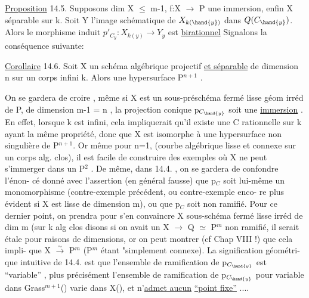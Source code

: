 
\uline{Proposition} 14.5. Supposons dim X $\leqslant$ m-1, 
 f:X $\to$ P une immersion,  enfin X séparable sur k. Soit Y l'image
schématique de $X_{k(\hand{y})}$ dans $Q(C_{\hand{y}})$. Alors le morphisme induit
$p'_{C_y} : X_{k(y)} \to Y_y$ est \uline{birationnel}
Signalons la conséquence suivante:

\uline{Corollaire} 14.6. Soit X un schéma algébrique projectif  
\uline{et séparable}
de dimension n sur un corps infini k. Alors  
  une hypersurface  P$^{n+1}$ .

On se gardera de croire , même si X est un sous-préschéma fermé
lisse géom irréd de P, de dimension m-1 = n ,  la projection conique p$_{C_{\hand{y}}}$
soit  une \uline{immersion} . En effet, lorsque k est infini, cela impliquerait
qu'il existe une C rationnelle sur k ayant la même propriété, donc que X
est isomorphe à une hypersurface non singulière de  P$^{n+1}$. Or
même pour n=1, (courbe algébrique  lisse  et connexe sur un corps alg.
clos), il est facile de construire des exemples où X ne peut s'immerger
dans un P$^2$ . De même, dans 14.4. , on se gardera de confondre l'énon-%
cé donné avec l'assertion (en général fausse) que p$_C$ soit lui-même un
monomorphisme (contre-exemple précédent, ou contre-exemple enco-%
re plus évident si X est lisse de dimension m), ou que p$_C$ soit non
ramifié. Pour ce dernier point, on prendra pour s'en convaincre X
sous-schéma fermé lisse  irréd de dim m (sur k alg clos disons
si  on avait un X $\to$ Q $\simeq$ P$^m$ non ramifié, il serait étale pour
raisons de dimensions, or on peut montrer (cf Chap VIII !) que cela impli-%
que X $\xrightarrow{\sim}$ P$^m$ (P$^m$ étant "simplement connexe). \hand{--} La signification géométri-%
que intuitive de 14.4. est que l'ensemble de
ramification de p$_{C_{\hand{y}}}$ est ``variable'' , plus précisément l'ensemble de
ramification de p$_{C_{\hand{y}}}$ pour  variable dans  Grass$^{m+1}$() varie dans X(), et
n'\uline{admet aucun}  \uline{``point fixe''} ....

